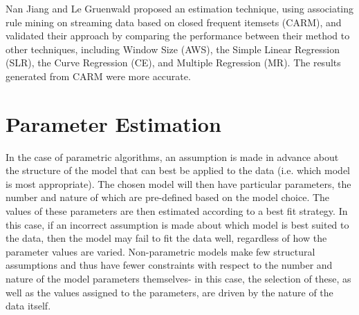 Nan Jiang and Le Gruenwald proposed an estimation technique, using associating rule mining on streaming data based on closed frequent itemsets (CARM), and validated their approach by comparing the performance between their method to other techniques, including Window Size (AWS), the Simple Linear Regression (SLR), the Curve Regression (CE), and Multiple Regression (MR). The results generated from CARM were more accurate.  

\section{Parameter Estimation}

In the case of parametric algorithms, an assumption is made in advance about the structure of the model that can best be applied to the data (i.e. which model is most appropriate). The chosen model will then have particular parameters, the number and nature of which are pre-defined based on the model choice. The values of these parameters are then estimated according to a best fit strategy. In this case, if an incorrect assumption is made about which model is best suited to the data, then the model may fail to fit the data well, regardless of how the parameter values are varied. Non-parametric models make few structural assumptions and thus have fewer constraints with respect to the number and nature of the model parameters themselves- in this case, the selection of these, as well as the values assigned to the parameters, are driven by the nature of the data itself.


